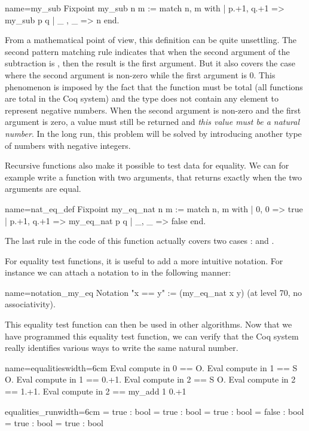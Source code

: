 \begin{coq}{name=my_sub}{}
Fixpoint my_sub n m :=
  match n, m with
  | p.+1, q.+1 => my_sub p q
  | _ , _ => n
  end.
\end{coq}
From a mathematical point of view, this definition can be quite
unsettling.  The second pattern matching rule indicates that when
the second argument of the subtraction is , then the result is
the first argument.  But it also covers the case where the second
argument is non-zero while the first argument is 0.  This phenomenon
is imposed by the fact that the function must be total (all functions
are total in the Coq system) and the type  does not contain any
element to represent negative numbers.  When the second argument is non-zero
and the first argument is zero, a value must still be returned and
{\em this value must be a natural number}.  In the long run, this
problem will be solved by introducing another type of numbers with
negative integers.

Recursive functions also make it possible to test data for
equality. We can for example write a function with two arguments, that
returns  exactly when the two arguments are equal.

\begin{coq}{name=nat_eq_def}{}
Fixpoint my_eq_nat n m :=
  match n, m with
  | 0, 0 => true
  | p.+1, q.+1 => my_eq_nat p q
  | _, _ => false
  end.
\end{coq}
The last rule in the code of this function actually covers two cases :
 and .

For equality test functions, it is useful to add a more intuitive
notation.  For instance we can attach a notation to  in
the following manner:

\begin{coq}{name=notation_my_eq}{}
Notation "x == y" := (my_eq_nat x y)
  (at level 70, no associativity).
\end{coq}
This equality test function can then be used in other algorithms.  Now
that we have programmed this equality test function, we can verify
that the Coq system really identifies various ways to write the same
natural number.

\begin{coq}{name=equalities}{width=6cm}
Eval compute in 0 == O.
Eval compute in 1 == S O.
Eval compute in 1 == 0.+1.
Eval compute in 2 == S O.
Eval compute in 2 == 1.+1.
Eval compute in 2 == my_add 1 0.+1
\end{coq}
\begin{coqout}{equalities_run}{width=6cm}
= true : bool
= true : bool
= true : bool
= false : bool
= true : bool
= true : bool
\end{coqout}

